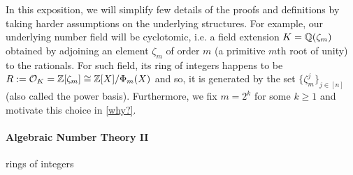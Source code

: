 In this exposition, we will simplify few details of the proofs and definitions by taking harder assumptions on the underlying structures. For example, our underlying number field will be cyclotomic, i.e. a field extension $K=\mathbb{Q}(\zeta_m)$ obtained by adjoining an element $\zeta_m$ of order $m$ (a primitive $m$th root of unity) to the rationals. For such field, its ring of integers happens to be $R := \mathcal{O}_K = \mathbb{Z}[\zeta_m] \cong \mathbb{Z}[X]/\Phi_m(X)$ and so, it is generated by the set $\{\zeta_m^j\}_{j \in [n]}$ (also called the power basis). Furthermore, we fix $m = 2^k$ for some $k \geq 1$ and motivate this choice in \ref{why?}.

\paragraph{Algebraic Number Theory II}
\begin{definition}[Trace]
\end{definition}
\begin{definition}[Norm]
\end{definition}
rings of integers
\begin{definition}
\end{definition}
\begin{definition}
\end{definition}
\begin{definition}[Dual]
\end{definition}

